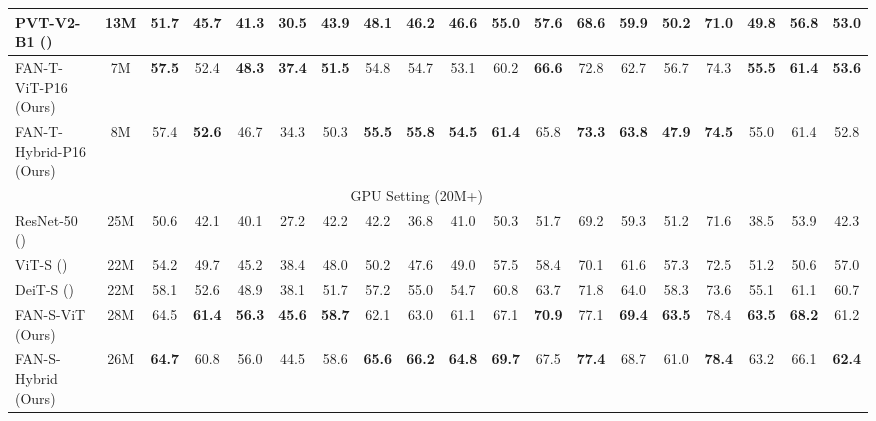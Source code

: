 \documentclass[nohyperref]{article}
\theoremstyle{plain}
\theoremstyle{definition}
\theoremstyle{remark}
\def \pzo {\phantom{0}}
\begin{document}
\begin{table*}[h]
\begin{savenotes}
\begin{minipage*}{1.0\textwidth}
{\begin{tabular}{l|c|c|cccc|cccc|cccc|cccc}
\multicolumn{1}{l|}{PVT-V2-B1 (\citeauthor{wang2021pyramid})} & 13M &  \multicolumn{1}{c|}{51.7 } & 45.7 & 41.3 & 30.5 & \multicolumn{1}{c|}{43.9} & 48.1 & 46.2 & 46.6 & \multicolumn{1}{c|}{55.0} & 57.6 & 68.6 & 59.9 & \multicolumn{1}{c|}{50.2} & 71.0 & 49.8 & 56.8 & 53.0 \\
\midrule
\multicolumn{1}{l|}{FAN-T-ViT-P16 (Ours)}& \pzo7M & \multicolumn{1}{c|}{\textbf{57.5 }} & {52.4}  & \textbf{48.3}  & \textbf{37.4}  & \multicolumn{1}{c|}{\textbf{51.5}} & {54.8}  & {54.7}  & {53.1}  & \multicolumn{1}{c|}{{60.2}} & \textbf{66.6}  & {72.8}  & {62.7}  & \multicolumn{1}{c|}{{56.7}} & {74.3}  & \textbf{55.5}  & \textbf{61.4}  & \textbf{53.6}  \\
\multicolumn{1}{l|}{FAN-T-Hybrid-P16 (Ours)}& \pzo8M & \multicolumn{1}{c|}{{57.4 }} & \textbf{52.6}  & {46.7}  & {34.3}  & \multicolumn{1}{c|}{{50.3}} & \textbf{55.5}  & \textbf{55.8}  & \textbf{54.5}  & \multicolumn{1}{c|}{\textbf{61.4}} & {65.8}  & \textbf{73.3}  & \textbf{63.8}  & \multicolumn{1}{c|}{\textbf{47.9}} & \textbf{74.5}  & {55.0}  & {61.4}  & {52.8}  \\
\midrule
\multicolumn{18}{c}{GPU Setting (20M+)}  \\
\toprule
\multicolumn{1}{l|}{ResNet-50 (\citeauthor{he2016deep})} & 25M & \multicolumn{1}{c|}{50.6} & 42.1 & 40.1 & 27.2 & \multicolumn{1}{c|}{42.2} & 42.2 & 36.8 & 41.0 & \multicolumn{1}{c|}{50.3} & 51.7 & 69.2 & 59.3 & \multicolumn{1}{c|}{51.2} & 71.6 & 38.5 & 53.9 & 42.3 \\
\multicolumn{1}{l|}{ViT-S (\citeauthor{dosovitskiy2020image})} & 22M & \multicolumn{1}{c|}{54.2} & 49.7 & 45.2 & 38.4 & \multicolumn{1}{c|}{48.0} & 50.2 & 47.6 & 49.0 & \multicolumn{1}{c|}{57.5} & 58.4 & 70.1 & 61.6 & \multicolumn{1}{c|}{57.3} & 72.5 & 51.2 & 50.6 & 57.0 \\
\multicolumn{1}{l|}{DeiT-S (\citeauthor{touvron2021training})}& 22M &  \multicolumn{1}{c|}{58.1} 
& 52.6 & 48.9 & {38.1} & \multicolumn{1}{c|}{51.7} & 57.2 & {55.0} & {54.7} & \multicolumn{1}{c|}{{60.8}} & {63.7} & 71.8 & 64.0 & \multicolumn{1}{c|}{58.3} & 73.6 & {55.1} & 61.1 & {60.7} \\
\midrule
\multicolumn{1}{l|}{FAN-S-ViT (Ours)}& 28M & \multicolumn{1}{c|}{{64.5}} & \textbf{61.4}  & \textbf{56.3}  & \textbf{45.6}  & \multicolumn{1}{c|}{\textbf{58.7}} & {62.1}  & {63.0}  & {61.1}  & \multicolumn{1}{c|}{{67.1}} & \textbf{70.9}  & {77.1}  & \textbf{69.4}  & \multicolumn{1}{c|}{\textbf{63.5}} & {78.4}  & \textbf{63.5}  & \textbf{68.2}  & {61.2}  \\
\multicolumn{1}{l|}{FAN-S-Hybrid (Ours)}& 26M & \multicolumn{1}{c|}{\textbf{64.7} } & {60.8}  & {56.0}  & {44.5}  & \multicolumn{1}{c|}{{58.6}} & \textbf{65.6}  & \textbf{66.2}  & \textbf{64.8}  & \multicolumn{1}{c|}{\textbf{69.7}} & {67.5}  & \textbf{77.4}  & {68.7}  & \multicolumn{1}{c|}{{61.0}} & \textbf{78.4}  & {63.2}  & {66.1}  & \textbf{62.4}  \\
\midrule



\end{tabular}}
\end{minipage*}
\end{savenotes}
\end{table*}
\end{document}
